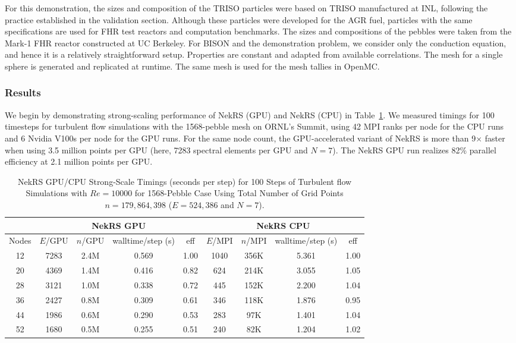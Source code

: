 For this demonstration, the sizes and composition of the TRISO particles were
based on TRISO manufactured at INL, following the practice established in the
validation section. Although these particles were developed for the AGR fuel,
particles with the same specifications are used for FHR test reactors and
computation benchmarks. The sizes and compositions of the pebbles were taken
from the Mark-1 FHR reactor constructed at UC Berkeley. For BISON and the
demonstration problem, we consider only the conduction equation, and hence  it
is a relatively straightforward setup. Properties are constant and adapted from
available correlations. The mesh for a single sphere is generated and
replicated at runtime. The same mesh is used for the mesh tallies in OpenMC.

\subsubsection{Results}
We begin by demonstrating strong-scaling performance of NekRS (GPU) and NekRS
(CPU) in Table~\ref{tab:nekrs}.  We measured timings for 100 timesteps for
turbulent flow simulations with the 1568-pebble mesh on ORNL's Summit, using 42
MPI ranks per node for the CPU runs and 6 Nvidia V100s per node for the GPU
runs.  For the same node count, the GPU-accelerated variant of NekRS is more
than 9$\times$ faster when using 3.5 million points per GPU (here, 7283
spectral elements per GPU and $N=7$).  The NekRS GPU run realizes 82\%
parallel efficiency at 2.1 million points per GPU.


\begin{table}
  \centering
  \begin{tabular}{c|cccc||cccc}
    \hline
  \multicolumn{1}{c|}{ } &
  \multicolumn{4}{|c||}{NekRS GPU}  &
  \multicolumn{4}{|c}{NekRS CPU} \\
  \hline
    Nodes  &  $E$/GPU & $n$/GPU & walltime/step (s) & eff & $E$/MPI& $n$/MPI & walltime/step (s) & eff\\
  \hline
    12 & 7283 & 2.4M & 0.569 & 1.00 & 1040 & 356K & 5.361  & 1.00\\
    20 & 4369 & 1.4M & 0.416 & 0.82 & 624 & 214K  & 3.055  & 1.05\\
    28 & 3121 & 1.0M & 0.338 & 0.72 & 445 & 152K & 2.200  & 1.04\\
    36 & 2427 & 0.8M & 0.309 & 0.61 & 346 & 118K & 1.876  & 0.95\\
    44 & 1986 & 0.6M & 0.290 & 0.53 & 283 & 97K & 1.401  & 1.04\\
    52 & 1680 & 0.5M & 0.255 & 0.51 & 240 & 82K & 1.204  & 1.02\\
    \hline \hline
  \end{tabular}
  \caption{NekRS GPU/CPU Strong-Scale Timings (seconds per step) for 100 Steps of Turbulent flow Simulations
   with $Re=10000$ for 1568-Pebble Case Using Total Number of Grid Points $n=179,864,398$ ($E=524,386$ and $N=7$).}
  \label{tab:nekrs}
\end{table}

